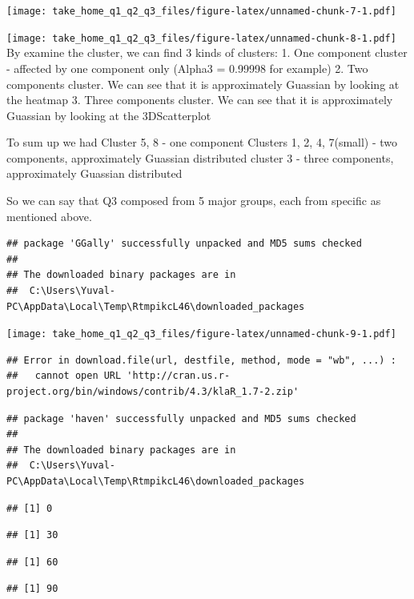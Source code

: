 \documentclass[
]{article}
\begin{document}
\texttt{[image: take\_home\_q1\_q2\_q3\_files/figure-latex/unnamed-chunk-7-1.pdf]}

\texttt{[image: take\_home\_q1\_q2\_q3\_files/figure-latex/unnamed-chunk-8-1.pdf]}
By examine the cluster, we can find 3 kinds of clusters: 1. One
component cluster - affected by one component only (Alpha3 = 0.99998 for
example) 2. Two components cluster. We can see that it is approximately
Guassian by looking at the heatmap 3. Three components cluster. We can
see that it is approximately Guassian by looking at the 3DScatterplot

To sum up we had Cluster 5, 8 - one component Clusters 1, 2, 4, 7(small)
- two components, approximately Guassian distributed cluster 3 - three
components, approximately Guassian distributed

So we can say that Q3 composed from 5 major groups, each from specific
as mentioned above.

\begin{verbatim}
## package 'GGally' successfully unpacked and MD5 sums checked
## 
## The downloaded binary packages are in
##  C:\Users\Yuval-PC\AppData\Local\Temp\RtmpikcL46\downloaded_packages
\end{verbatim}

\texttt{[image: take\_home\_q1\_q2\_q3\_files/figure-latex/unnamed-chunk-9-1.pdf]}

\begin{verbatim}
## Error in download.file(url, destfile, method, mode = "wb", ...) : 
##   cannot open URL 'http://cran.us.r-project.org/bin/windows/contrib/4.3/klaR_1.7-2.zip'
\end{verbatim}

\begin{verbatim}
## package 'haven' successfully unpacked and MD5 sums checked
## 
## The downloaded binary packages are in
##  C:\Users\Yuval-PC\AppData\Local\Temp\RtmpikcL46\downloaded_packages
\end{verbatim}

\begin{verbatim}
## [1] 0
\end{verbatim}

\begin{verbatim}
## [1] 30
\end{verbatim}

\begin{verbatim}
## [1] 60
\end{verbatim}

\begin{verbatim}
## [1] 90
\end{verbatim}
\end{document}
